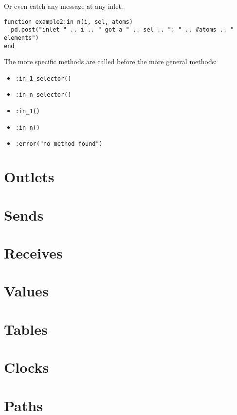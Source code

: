 \documentclass{article}
\begin{document}
Or even catch any message at any inlet:

\begin{verbatim}
function example2:in_n(i, sel, atoms)
  pd.post("inlet " .. i .. " got a " .. sel .. ": " .. #atoms .. " elements")
end
\end{verbatim}

The more specific methods are called before the more general methods:

\begin{itemize}
\item {\tt :in\_1\_selector()}
\item {\tt :in\_n\_selector()}
\item {\tt :in\_1()}
\item {\tt :in\_n()}
\item {\tt :error("no method found")}
\end{itemize}

\section{Outlets}

\section{Sends}

\section{Receives}

\section{Values}

\section{Tables}

\section{Clocks}

\section{Paths}
\end{document}

